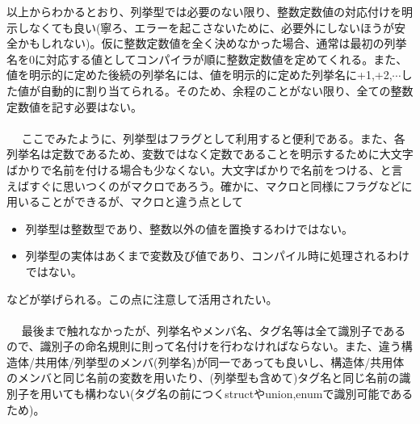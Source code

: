 以上からわかるとおり、列挙型では必要のない限り、整数定数値の対応付けを明示しなくても良い(寧ろ、エラーを起こさないために、必要外にしないほうが安全かもしれない)。仮に整数定数値を全く決めなかった場合、通常は最初の列挙名を0に対応する値としてコンパイラが順に整数定数値を定めてくれる。また、値を明示的に定めた後続の列挙名には、値を明示的に定めた列挙名に+1,+2,$\cdots$した値が自動的に割り当てられる。そのため、余程のことがない限り、全ての整数定数値を記す必要はない。
\\ \\　
ここでみたように、列挙型はフラグとして利用すると便利である。また、各列挙名は定数であるため、変数ではなく定数であることを明示するために大文字ばかりで名前を付ける場合も少なくない。大文字ばかりで名前をつける、と言えばすぐに思いつくのがマクロであろう。確かに、マクロと同様にフラグなどに用いることができるが、マクロと違う点として
\begin{itemize}
\item 列挙型は整数型であり、整数以外の値を置換するわけではない。
\item 列挙型の実体はあくまで変数及び値であり、コンパイル時に処理されるわけではない。
\end{itemize}
などが挙げられる。この点に注意して活用されたい。
\\ \\　
最後まで触れなかったが、列挙名やメンバ名、タグ名等は全て識別子であるので、識別子の命名規則に則って名付けを行わなければならない。また、違う構造体/共用体/列挙型のメンバ(列挙名)が同一であっても良いし、構造体/共用体のメンバと同じ名前の変数を用いたり、(列挙型も含めて)タグ名と同じ名前の識別子を用いても構わない(タグ名の前につくstructやunion,enumで識別可能であるため)。
\newpage

